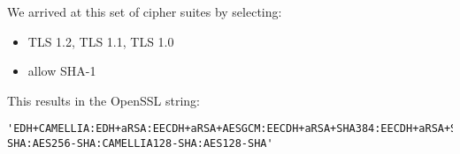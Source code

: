 We arrived at this set of cipher suites by selecting:

\begin{itemize}
\item TLS 1.2, TLS 1.1, TLS 1.0
\item allow SHA-1


\end{itemize}

This results in the OpenSSL string:

\begin{lstlisting}[breaklines]
'EDH+CAMELLIA:EDH+aRSA:EECDH+aRSA+AESGCM:EECDH+aRSA+SHA384:EECDH+aRSA+SHA256:EECDH:+CAMELLIA256:+AES256:+CAMELLIA128:+AES128:+SSLv3:!aNULL:!eNULL:!LOW:!3DES:!MD5:!EXP:!PSK:!SRP:!DSS:!RC4:!SEED:!ECDSA:CAMELLIA256-SHA:AES256-SHA:CAMELLIA128-SHA:AES128-SHA'
\end{lstlisting}

